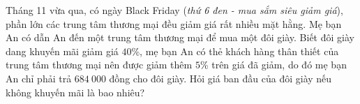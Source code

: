 \begin{bt}%
Tháng 11 vừa qua, có ngày Black Friday (\textit{thứ 6 đen - mua sắm siêu giảm giá}), phần lớn các trung tâm thương mại đều giảm giá rất nhiều mặt hằng. Mẹ bạn An có dẫn An đến một trung tâm thương mại để mua một đôi giày. Biết đôi giày dang khuyến mãi giảm giá $40$\%, mẹ bạn An có thẻ khách hàng thân thiết của trung tâm thương mại nên được giảm thêm $5$\% trên giá đã giảm, do đó mẹ bạn An chỉ phải trả $684\ 000$ đồng cho đôi giày. Hỏi giá ban đầu của đôi giày nếu không khuyến mãi là bao nhiêu?	
\end{bt}

